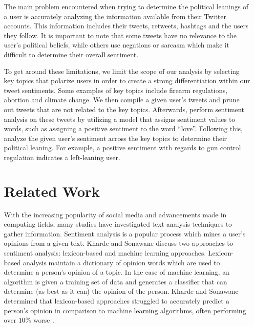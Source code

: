 \documentclass[letterpaper]{article} %
\begin{document}
The main problem encountered when trying to determine the political leanings of a user is accurately analyzing the information available from their Twitter accounts. This information includes their tweets, retweets, hashtags and the users they follow. It is important to note that some tweets have no relevance to the user’s political beliefs, while others use negations or sarcasm which make it difficult to determine their overall sentiment.

To get around these limitations, we limit the scope of our analysis by selecting key topics that polarize users in order to create a strong differentiation within our tweet sentiments. Some examples of key topics include firearm regulations, abortion and climate change. We then compile a given user’s tweets and prune out tweets that are not related to the key topics. Afterwards, perform sentiment analysis on these tweets by utilizing a model that assigns sentiment values to words, such as assigning a positive sentiment to the word “love”. Following this, analyze the given user's sentiment across the key topics to determine their political leaning. For example, a positive sentiment with regards to gun control regulation indicates a left-leaning user. 



\section{Related Work}

With the increasing popularity of social media and advancements made in computing fields, many studies have investigated text analysis techniques to gather information. Sentiment analysis is a popular process which mines a user’s opinions from a given text. Kharde and Sonawane discuss two approaches to sentiment analysis: lexicon-based and machine learning approaches. Lexicon-based analysis maintain a dictionary of opinion words which are used to determine a person’s opinion of a topic. In the case of machine learning, an algorithm is given a training set of data and generates a classifier that can determine (as best as it can) the opinion of the person. Kharde and Sonawane determined that lexicon-based approaches struggled to accurately predict a person’s opinion in comparison to machine learning algorithms, often performing over 10\% worse \cite{khardeSentiment}.
\end{document}
